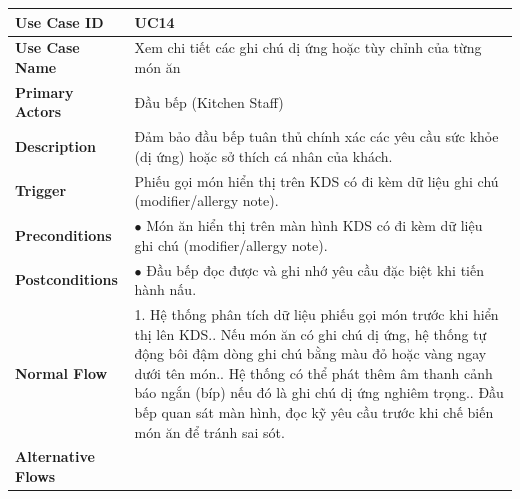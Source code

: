 \begin{longtable}{|p{3.5cm}|p{12.5cm}|}
\hline
\textbf{Use Case ID} & UC14 \\ \hline
\textbf{Use Case Name} & Xem chi tiết các ghi chú dị ứng hoặc tùy chỉnh của từng món ăn \\ \hline
\textbf{Primary Actors} & Đầu bếp (Kitchen Staff) \\ \hline
\textbf{Description} & Đảm bảo đầu bếp tuân thủ chính xác các yêu cầu sức khỏe (dị ứng) hoặc sở thích cá nhân của khách. \\ \hline
\textbf{Trigger} & Phiếu gọi món hiển thị trên KDS có đi kèm dữ liệu ghi chú (modifier/allergy note). \\ \hline
\textbf{Preconditions} & $\bullet$ Món ăn hiển thị trên màn hình KDS có đi kèm dữ liệu ghi chú (modifier/allergy note). \\ \hline
\textbf{Postconditions} & $\bullet$ Đầu bếp đọc được và ghi nhớ yêu cầu đặc biệt khi tiến hành nấu. \\ \hline
\textbf{Normal Flow} &
1. Hệ thống phân tích dữ liệu phiếu gọi món trước khi hiển thị lên KDS.\newline
2. Nếu món ăn có ghi chú dị ứng, hệ thống tự động bôi đậm dòng ghi chú bằng màu đỏ hoặc vàng ngay dưới tên món.\newline
3. Hệ thống có thể phát thêm âm thanh cảnh báo ngắn (bíp) nếu đó là ghi chú dị ứng nghiêm trọng.\newline
4. Đầu bếp quan sát màn hình, đọc kỹ yêu cầu trước khi chế biến món ăn để tránh sai sót. \\ \hline
\textbf{Alternative Flows} &
\\ \hline
\end{longtable}

